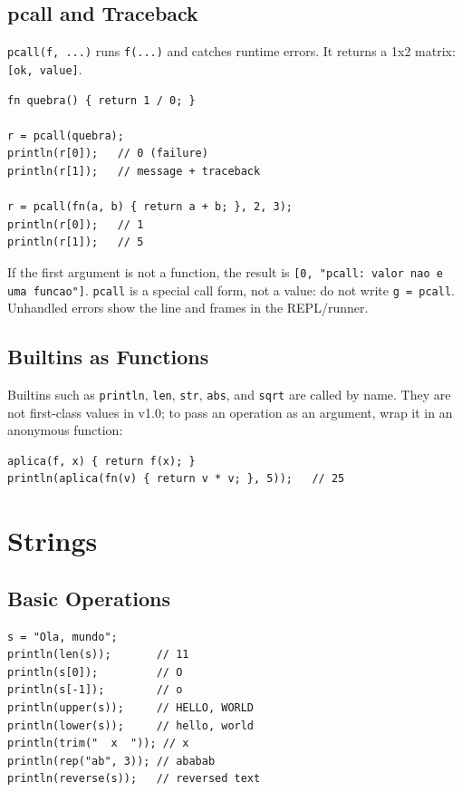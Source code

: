 \documentclass[11pt,a4paper,oneside]{report}
\newcommand{\code}[1]{\texttt{#1}}
\begin{document}
\section{pcall and Traceback}
\label{sec:pcall}
\code{pcall(f, ...)} runs \code{f(...)} and catches runtime errors. It
returns a 1x2 matrix: \code{[ok, value]}.

\begin{lstlisting}
fn quebra() { return 1 / 0; }

r = pcall(quebra);
println(r[0]);   // 0 (failure)
println(r[1]);   // message + traceback

r = pcall(fn(a, b) { return a + b; }, 2, 3);
println(r[0]);   // 1
println(r[1]);   // 5
\end{lstlisting}

If the first argument is not a function, the result is
\code{[0, "pcall: valor nao e uma funcao"]}. \code{pcall} is a special
call form, not a value: do not write \code{g = pcall}. Unhandled errors
show the line and frames in the REPL/runner.

\section{Builtins as Functions}
Builtins such as \code{println}, \code{len}, \code{str}, \code{abs},
and \code{sqrt} are called by name. They are not first-class values in
v1.0; to pass an operation as an argument, wrap it in an anonymous
function:

\begin{lstlisting}
aplica(f, x) { return f(x); }
println(aplica(fn(v) { return v * v; }, 5));   // 25
\end{lstlisting}

\chapter{Strings}
\label{cap:strings}

\section{Basic Operations}
\begin{lstlisting}
s = "Ola, mundo";
println(len(s));       // 11
println(s[0]);         // O
println(s[-1]);        // o
println(upper(s));     // HELLO, WORLD
println(lower(s));     // hello, world
println(trim("  x  ")); // x
println(rep("ab", 3)); // ababab
println(reverse(s));   // reversed text
\end{lstlisting}
\end{document}
